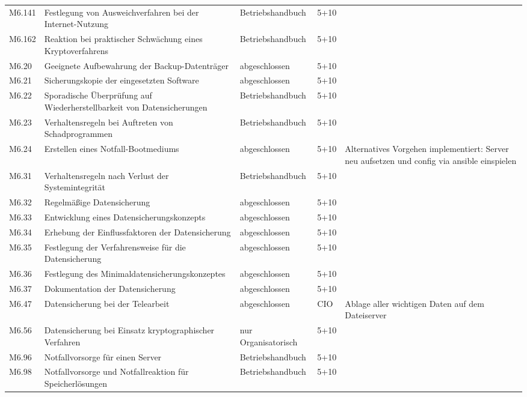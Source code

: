 \begin{longtable}{lp{3.7cm}p{3cm}lp{3.8cm}}
M6.141 & Festlegung von Ausweichverfahren bei der Internet-Nutzung & Betriebshandbuch & 5+10 &  \\
M6.162 & Reaktion bei praktischer Schwächung eines Kryptoverfahrens & Betriebshandbuch & 5+10 &  \\
M6.20 & Geeignete Aufbewahrung der Backup-Datenträger & abgeschlossen & 5+10 &  \\
M6.21 & Sicherungskopie der eingesetzten Software & abgeschlossen & 5+10 &  \\
M6.22 & Sporadische Überprüfung auf Wiederherstellbarkeit von Datensicherungen & Betriebshandbuch & 5+10 &  \\
M6.23 & Verhaltensregeln bei Auftreten von Schadprogrammen & Betriebshandbuch & 5+10 &  \\
M6.24 & Erstellen eines Notfall-Bootmediums & abgeschlossen & 5+10 & Alternatives Vorgehen implementiert: Server neu aufsetzen und config via ansible einspielen \\
M6.31 & Verhaltensregeln nach Verlust der Systemintegrität & Betriebshandbuch & 5+10 &  \\
M6.32 & Regelmäßige Datensicherung & abgeschlossen & 5+10 &  \\
M6.33 & Entwicklung eines Datensicherungskonzepts & abgeschlossen & 5+10 &  \\
M6.34 & Erhebung der Einflussfaktoren der Datensicherung & abgeschlossen & 5+10 &  \\
M6.35 & Festlegung der Verfahrensweise für die Datensicherung & abgeschlossen & 5+10 &  \\
M6.36 & Festlegung des Minimaldatensicherungskonzeptes & abgeschlossen & 5+10 &  \\
M6.37 & Dokumentation der Datensicherung & abgeschlossen & 5+10 &  \\
M6.47 & Datensicherung bei der Telearbeit & abgeschlossen & CIO & Ablage aller wichtigen Daten auf dem Dateiserver \\
M6.56 & Datensicherung bei Einsatz kryptographischer Verfahren & nur Organisatorisch & 5+10 &  \\
M6.96 & Notfallvorsorge für einen Server & Betriebshandbuch & 5+10 &  \\
M6.98 & Notfallvorsorge und Notfallreaktion für Speicherlösungen & Betriebshandbuch & 5+10 &  \\
\bottomrule
\end{longtable}

\newpage
